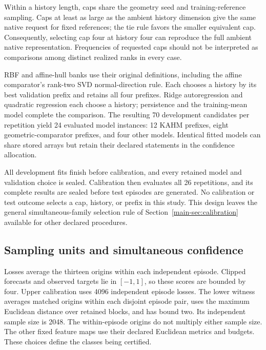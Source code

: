 Within a history length, caps share the geometry seed and training-reference
sampling. Caps at least as large as the ambient history dimension give the
same native request for fixed references; the tie rule favors the smaller
equivalent cap. Consequently, selecting cap four at history four can reproduce
the full ambient native representation. Frequencies of requested caps should
not be interpreted as comparisons among distinct realized ranks in every case.

RBF and affine-hull banks use their original definitions, including the
affine comparator's rank-two SVD normal-direction rule. Each chooses a
history by its best validation prefix and retains all four prefixes.
Ridge autoregression and quadratic regression each choose a history;
persistence and the training-mean model complete the comparison. The resulting
70 development candidates per repetition yield 24 evaluated model instances:
12 KAHM prefixes, eight geometric-comparator prefixes, and four other models.
Identical fitted models can share stored arrays but retain their declared
statements in the confidence allocation.

All \DimDevelopmentFits{} development fits finish before calibration, and
every retained model and validation choice is sealed. Calibration then
evaluates all 26 repetitions, and its complete results are sealed before test
episodes are generated. No calibration or test outcome selects a cap,
history, or prefix in this study. This design leaves the general
simultaneous-family selection rule of Section~\ref{main-sec:calibration}
available for other declared procedures.

\subsection{Sampling units and simultaneous confidence}

Losses average the thirteen origins within each independent episode.
Clipped forecasts and observed targets lie in $[-1,1]$, so these scores are
bounded by four. Upper calibration uses 4096 independent episode losses.
The lower witness averages matched origins within each disjoint episode pair,
uses the maximum Euclidean distance over retained blocks, and has bound two.
Its independent sample size is 2048. The within-episode origins do not multiply
either sample size. The other fixed feature maps use their declared
Euclidean metrics and budgets. These choices define the classes being
certified.

